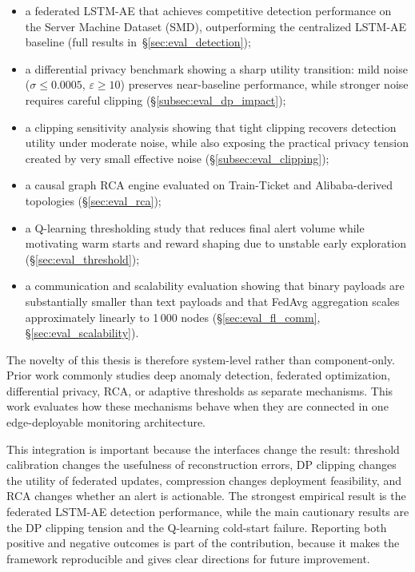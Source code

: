 \begin{itemize}
    \item a federated LSTM-AE that achieves competitive detection performance
    on the Server Machine Dataset (SMD), outperforming the centralized LSTM-AE
    baseline (full results in~\S\ref{sec:eval_detection});
    \item a differential privacy benchmark showing a sharp utility transition:
    mild noise ($\sigma \leq 0.0005$, $\varepsilon \geq 10$) preserves
    near-baseline performance, while stronger noise requires careful clipping
    (\S\ref{subsec:eval_dp_impact});
    \item a clipping sensitivity analysis showing that tight clipping recovers
    detection utility under moderate noise, while also exposing the practical
    privacy tension created by very small effective noise
    (\S\ref{subsec:eval_clipping});
    \item a causal graph RCA engine evaluated on Train-Ticket and
    Alibaba-derived topologies (\S\ref{sec:eval_rca});
    \item a Q-learning thresholding study that reduces final alert volume while
    motivating warm starts and reward shaping due to unstable early exploration
    (\S\ref{sec:eval_threshold});
    \item a communication and scalability evaluation showing that binary
    payloads are substantially smaller than text payloads and that FedAvg
    aggregation scales approximately linearly to 1\,000 nodes
    (\S\ref{sec:eval_fl_comm}, \S\ref{sec:eval_scalability}).
\end{itemize}

The novelty of this thesis is therefore system-level rather than component-only.
Prior work commonly studies deep anomaly detection, federated optimization,
differential privacy, RCA, or adaptive thresholds as separate mechanisms. This
work evaluates how these mechanisms behave when they are connected in one
edge-deployable monitoring architecture.

This integration is important because the interfaces change the result:
threshold calibration changes the usefulness of reconstruction errors, DP
clipping changes the utility of federated updates, compression changes
deployment feasibility, and RCA changes whether an alert is actionable. The
strongest empirical result is the federated LSTM-AE detection performance,
while the main cautionary results are the DP clipping tension and the
Q-learning cold-start failure. Reporting both positive and negative outcomes is
part of the contribution, because it makes the framework reproducible and gives
clear directions for future improvement.
